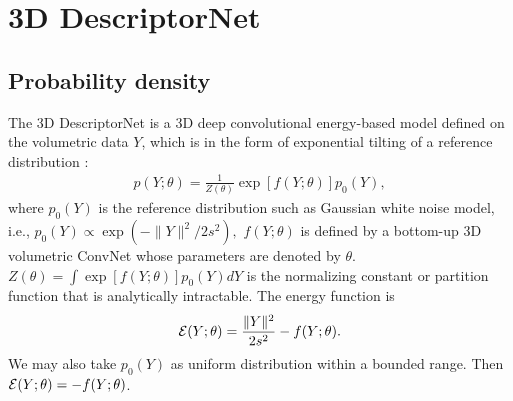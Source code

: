 \documentclass[10pt,twocolumn,letterpaper]{article}
\begin{document}
\section{3D DescriptorNet}
 
\subsection{Probability density}
The 3D DescriptorNet is a 3D deep convolutional energy-based model defined on the volumetric data $Y$, which is in the form of exponential tilting of a reference distribution \cite{XieLuICML}: 
\begin{eqnarray} 
   p(Y; \theta) = \frac{1}{Z(\theta)} \exp\left[ f(Y; \theta)\right] p_0(Y), 
\end{eqnarray}
 where $p_0(Y)$ is the reference distribution such as Gaussian white noise model, i.e.,
$ p_0(Y) \propto \exp \left( -{\|Y\|^2}/{2 s^2}\right), 
$  
 $f(Y; \theta)$ is defined by a bottom-up 3D volumetric ConvNet whose parameters are denoted by $\theta$. $Z(\theta) = \int  \exp\left[ f(Y; \theta)\right] p_0(Y) dY$ is the normalizing constant or partition function that is analytically intractable. The energy function is
 \begin{eqnarray}{\cal E}(Y; \theta) = \frac{\|Y\|^2}{2s^2} - f(Y; \theta). 
\end{eqnarray}
We may also take $p_0(Y)$ as uniform distribution within a bounded range. Then ${\cal E}(Y; \theta) = - f(Y; \theta)$. 
\end{document}
